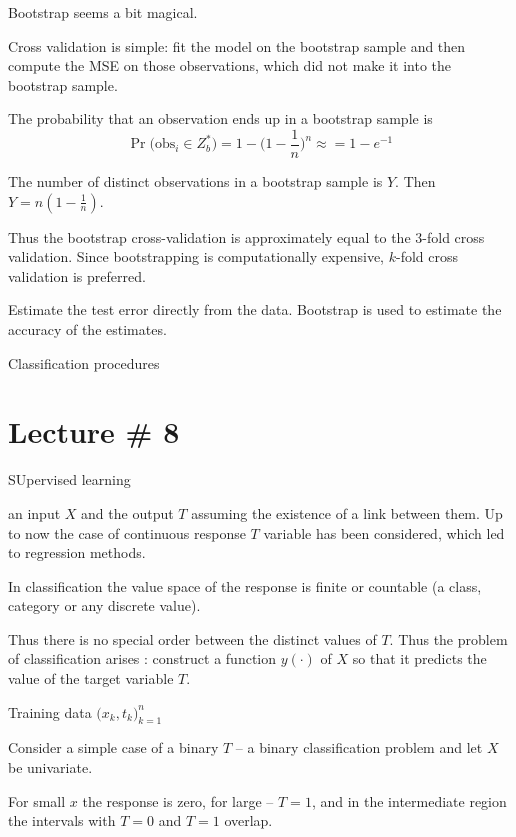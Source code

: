 \documentclass[a4paper]{article}
\begin{document}
Bootstrap seems a bit magical.

Cross validation is simple: fit the model on the bootstrap sample and then compute the MSE on those observations, which did not make it into the bootstrap sample.

The probability that an observation ends up in a bootstrap sample is 
\[\Pr\big(\text{obs}_i\in Z^*_b\big) = 1 - \big(1-\frac{1}{n}\big)^n\approx = 1-e^{-1}\]

The number of distinct observations in a bootstrap sample is $Y$. Then $Y = n (1-\frac{1}{n})$.

Thus the bootstrap cross-validation is approximately equal to the $3$-fold cross validation.
Since bootstrapping is computationally expensive, $k$-fold cross validation is preferred.




Estimate the test error directly from the data.
Bootstrap is used to estimate the accuracy of the estimates.




Classification procedures


\section{Lecture \# 8} %
\label{sec:lecture_8}

SUpervised learning

an input $X$ and the output $T$ assuming the existence of a link between them. Up to now the case of continuous response $T$ variable has been considered, which led to regression methods.

In classification the value space of the response is finite or countable (a class, category or any discrete value).

Thus there is no special order between the distinct values of $T$. 
Thus the problem of classification arises :
construct a function $y(\cdot)$ of $X$ so that it predicts the value of the target variable $T$.

Training data $\big(x_k, t_k\big)_{k=1}^n$ 

Consider a simple case of a binary $T$ -- a binary classification problem and let $X$ be univariate.

For small $x$ the response is zero, for large -- $T=1$, and in the intermediate region the intervals with $T=0$ and $T=1$ overlap.
\end{document}
